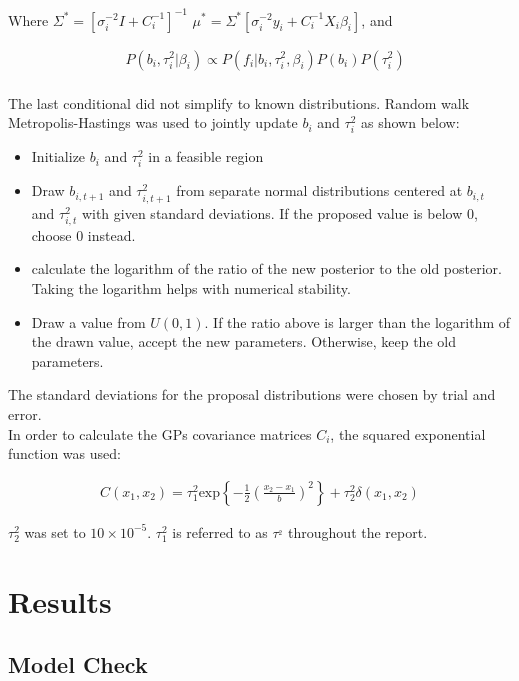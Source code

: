 \documentclass[paper=a4, fontsize=11pt]{scrartcl}
\begin{document}
Where  $\Sigma^*=[\sigma_i^{-2}I + C_i^{-1}]^{-1} $ $\mu^*=\Sigma^*[\sigma_i^{-2}y_i + C_i^{-1}X_i\beta_i]$, and

\begin{align*}
     & P(b_i,\tau_i^2 | \beta_i)  \propto P(f_i|b_i, \tau_i^2, \beta_i)P(b_i)P(\tau_i^2) \\
\end{align*}

The last conditional  did not simplify to known distributions. Random walk Metropolis-Hastings was used to jointly update $b_i$ and $\tau_i^2$ as shown below:

\begin{itemize}
    \item Initialize $b_i$ and $\tau_i^2$ in a feasible region
    \item Draw $b_{i, t+1}$ and $\tau^2_{i, t+1}$ from separate normal distributions centered at  $b_{i, t}$ and $\tau^2_{i, t}$ with given standard deviations. If the proposed value is below 0, choose 0 instead. 
    \item calculate the logarithm of the ratio of the 
    new posterior to the old posterior. Taking the logarithm helps with numerical stability.
    \item Draw a value from $U(0,1)$. If the ratio above is larger than the logarithm of the drawn value, accept the new parameters. Otherwise, keep the old parameters.
\end{itemize}

The standard deviations for the proposal distributions were chosen by trial and error.\\


In order to calculate the GPs covariance matrices $C_i$, the squared exponential function was used:

\begin{align*}
    C(x_1, x_2) = \tau_1^2 \mbox{exp} \left\{-\frac{1}{2} \left( \frac{x_2 - x_1}{b}\right)^2 \right\} + \tau_2^2  \delta(x_1, x_2)
\end{align*}

$\tau^2_2$ was set to $10 \times 10^{-5}$. $\tau^2_1$ is referred to as $\tau^_2$ throughout the report.

\section{Results}

\subsection{Model Check}
\end{document}
